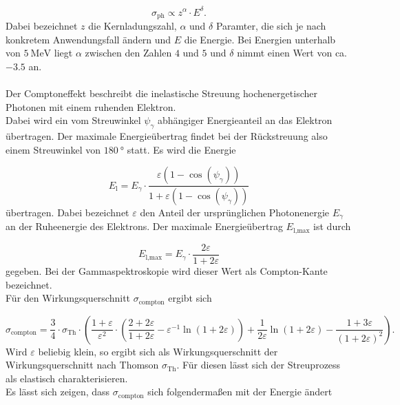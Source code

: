 \begin{equation}
  \label{eqn:phquerschnitt}
  \sigma_\text{ph} \propto z^{\alpha} \cdot E^{\delta}.
\end{equation}
Dabei bezeichnet $z$ die Kernladungszahl, $\alpha$ und $\delta$ Paramter, die sich je nach konkretem Anwendungsfall
ändern und $E$ die Energie. Bei Energien unterhalb von $\SI{5}{\mega\electronvolt}$ liegt $\alpha$ zwischen den Zahlen
$4$ und $5$ und $\delta$ nimmt einen Wert von ca. $-3.5$ an.\\ \\
Der Comptoneffekt beschreibt die inelastische Streuung hochenergetischer Photonen mit einem
ruhenden Elektron.\\
Dabei wird ein vom Streuwinkel $\psi_{\gamma}$ abhängiger Energieanteil an das Elektron übertragen.
Der maximale Energieübertrag findet bei der Rückstreuung also einem Streuwinkel
von $\SI{180}{\degree}$ statt. Es wird die Energie

\begin{equation}
  \label{eqn:comptonuebertrag}
  E_\text{l} = E_{\gamma} \cdot \frac{\varepsilon \left( 1 - \cos\left( \psi_{\gamma} \right) \right)}{1
  + \varepsilon \left( 1 - \cos\left( \psi_{\gamma} \right) \right)}
\end{equation}
übertragen. Dabei bezeichnet $\varepsilon$ den Anteil der ursprünglichen
Photonenergie $E_{\gamma}$ an der Ruheenergie des Elektrons. Der maximale Energieübertrag $E_\text{l,max}$ ist durch

\begin{equation}
  \label{eqn:ckante}
  E_\text{l,max} = E_\gamma \cdot \frac{2\varepsilon}{1 + 2\varepsilon}
\end{equation}
gegeben. Bei der Gammaspektroskopie wird dieser Wert als Compton-Kante bezeichnet.\\
Für den Wirkungsquerschnitt $\sigma_\text{compton}$ ergibt sich

\begin{equation}
  \label{eqn:comptonquerschnitt}
  \sigma_\text{compton} = \frac{3}{4} \cdot \sigma_\text{Th}
  \cdot \left( \frac{1 + \varepsilon}{\varepsilon^2}
  \cdot \left( \frac{2 + 2\varepsilon}{1 + 2\varepsilon} - \varepsilon^{-1} \ln\left( 1 + 2\varepsilon \right) \right)
  + \frac{1}{2\varepsilon} \ln\left( 1 + 2\varepsilon \right) - \frac{1 + 3\varepsilon}{(1 + 2\varepsilon)^2}  \right) .
\end{equation}
Wird $\varepsilon$ beliebig klein, so ergibt sich als Wirkungsquerschnitt der Wirkungsquerschnitt nach Thomson
$\sigma_\text{Th}$. Für diesen lässt sich der Streuprozess als elastisch charakterisieren.\\
Es lässt sich zeigen, dass $\sigma_\text{compton}$ sich folgendermaßen mit der Energie ändert

